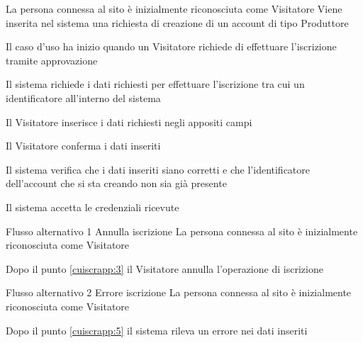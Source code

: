 \tabcuvspace

{}
{La persona connessa al sito è inizialmente riconosciuta come Visitatore}
{Viene inserita nel sistema una richiesta di creazione di un account di tipo Produttore}
{\begin{enumCU}
	\item Il caso d'uso ha inizio quando un Visitatore richiede di effettuare l'iscrizione tramite approvazione
	\item Il sistema richiede i dati richiesti per effettuare l'iscrizione  tra cui un identificatore all'interno del sistema
	\item Il Visitatore inserisce i dati richiesti negli appositi campi \label{cuiscrapp:3}
	\item Il Visitatore conferma i dati inseriti
	\item Il sistema verifica che i dati inseriti siano corretti e che l'identificatore dell'account che si sta creando non sia già presente \label{cuiscrapp:5}
	\item Il sistema accetta le credenziali ricevute 
\end{enumCU}}
%
{Flusso alternativo 1}%
{Annulla iscrizione}%
{La persona connessa al sito è inizialmente riconosciuta come Visitatore}%
{\postNulle}%
{\begin{enumCU}
		\item Dopo il punto \ref{cuiscrapp:3} il Visitatore annulla l'operazione di iscrizione
	\end{enumCU}}%
%
{Flusso alternativo 2}%
{Errore iscrizione}%
{La persona connessa al sito è inizialmente riconosciuta come Visitatore}%
{\postNulle}%
{\begin{enumCU}
		\item Dopo il punto \ref{cuiscrapp:5} il sistema rileva un errore nei dati inseriti
	\end{enumCU}}%

\tabcuvspace

